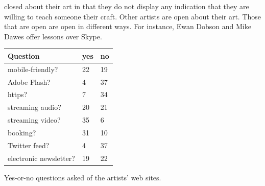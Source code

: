 \documentclass[unicode,hyperfootnotes=false,xetex,colorlinks=true,nofonts,nobib]{tufte-handout}
\begin{document}
closed about their art in that they do not display any indication that
they are willing to teach someone their craft. Other artists are open
about their art. Those that are open are open in different ways. For
instance, Ewan Dobson and Mike Dawes offer lessons over Skype.
\begin{margintable}\centering
  \small
  \begin{tabular}{p{} l l}\toprule
    Question & yes & no \\\midrule
    mobile-friendly? & 22 & 19\\
    Adobe Flash? & 4 & 37\\
    https? & 7 & 34\\
    streaming audio? & 20 & 21\\
    streaming video? & 35 & 6\\
    booking? & 31 & 10\\
    Twitter feed? & 4 & 37\\
    electronic newsletter? & 19 & 22\\
    \bottomrule
  \end{tabular}
  \vspace{6pt}
  \caption{Yes-or-no questions asked of the artists' web sites.}
\end{margintable}
\end{document}
